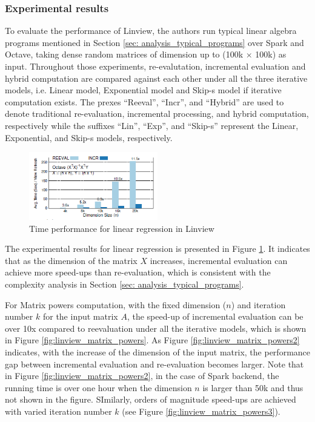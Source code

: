 \subsubsection{Experimental results}
To evaluate the performance of Linview, the authors run typical linear algebra programs mentioned in Section \ref{sec: analysis_typical_programs} over Spark and Octave, taking dense random matrices of dimension up to (100k $\times$ 100k) as input. Throughout those experiments, re-evalutation, incremental evaluation and hybrid computation are compared against each other under all the three iterative models, i.e. Linear model, Exponential model and Skip-s model if iterative computation exists. The prexes ``Reeval'', ``Incr'', and ``Hybrid'' are used to denote traditional re-evaluation, incremental processing, and hybrid computation, respectively while the suffixes ``Lin'', ``Exp'', and ``Skip-s'' represent the Linear, Exponential, and Skip-s models, respectively.

\begin{figure}
    \centering
    \includegraphics[height = 0.25\textwidth, width=0.5\textwidth]{Figures/linview_regression_exp.png}
    \caption{Time performance for linear regression in Linview}
    \label{fig:linview_linear_regression}
\end{figure}


The experimental results for linear regression is presented in Figure \ref{fig:linview_linear_regression}. It indicates that as the dimension of the matrix $X$ increases, incremental evaluation can achieve more speed-ups than re-evaluation, which is consistent with the complexity analysis in Section \ref{sec: analysis_typical_programs}.

For Matrix powers computation, with the fixed dimension ($n$) and iteration number $k$ for the input matrix $A$, the speed-up of incremental evaluation can be over 10x compared to reevaluation under all the iterative models, which is shown in Figure \ref{fig:linview_matrix_powers}. As Figure \ref{fig:linview_matrix_powers2} indicates, with the increase of the dimension of the input matrix, the performance gap between incremental evaluation and re-evaluation becomes larger. Note that in Figure \ref{fig:linview_matrix_powers2}, in the case of Spark backend, the running time is over one hour when the dimension $n$ is larger than 50k and thus not shown in the figure. SImilarly, orders of magnitude speed-ups are achieved with varied iteration number $k$ (see Figure \ref{fig:linview_matrix_powers3}).

